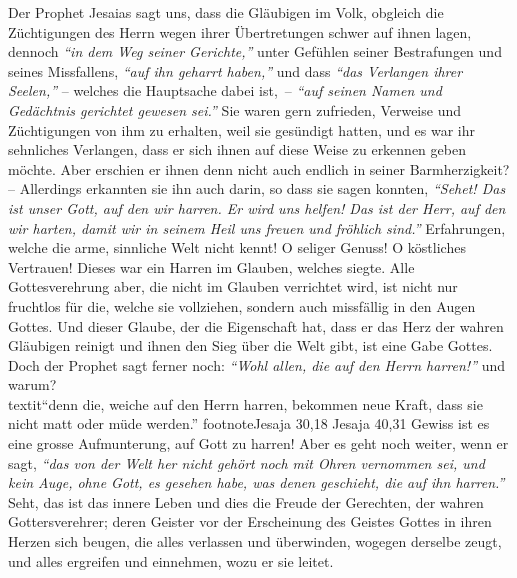 Der Prophet Jesaias sagt uns, dass die Gläubigen im Volk, obgleich die
Züchtigungen des Herrn wegen ihrer Übertretungen schwer auf ihnen lagen,
dennoch
\textit{"`in dem Weg seiner Gerichte,"'} unter Gefühlen seiner Bestrafungen und
seines Missfallens, \textit{"`auf ihn geharrt haben,"'} und dass \textit{"`das
Verlangen ihrer Seelen,"'} -- welches die Hauptsache dabei ist,~--
\textit{"`auf seinen Namen und Gedächtnis gerichtet gewesen
sei."'}
Sie waren gern
zufrieden, Verweise und Züchtigungen von ihm zu erhalten, weil sie gesündigt
hatten, und es war ihr sehnliches Verlangen, dass er sich ihnen auf diese Weise
zu erkennen geben möchte.  Aber erschien er ihnen denn
nicht auch endlich in
seiner Barmherzigkeit? -- Allerdings erkannten sie ihn auch darin, so dass sie
sagen konnten,
\textit{"`Sehet! Das ist unser Gott, auf den wir harren. Er wird uns
helfen! Das ist der Herr, auf den wir harten, damit wir in seinem Heil uns
freuen und fröhlich sind."'}
Erfahrungen, welche die arme,
sinnliche Welt nicht kennt! O seliger Genuss! O köstliches
Vertrauen! Dieses war
ein Harren im Glauben, welches siegte. Alle Gottesverehrung aber, die nicht im
Glauben verrichtet wird, ist nicht nur fruchtlos
 für die, welche sie vollziehen,
sondern auch missfällig in den Augen Gottes. Und dieser Glaube, der die
Eigenschaft hat, dass er das Herz der wahren Gläubigen reinigt und ihnen den
Sieg über die Welt gibt, ist eine Gabe Gottes. Doch
der Prophet sagt
ferner noch:
\textit{"`Wohl allen, die auf den Herrn harren!"'} und warum?\\textit{"`denn
die, weiche
auf den Herrn harren, bekommen neue Kraft, dass sie nicht matt oder müde
werden."'}
footnote{Jesaja 30,18 Jesaja 40,31}
Gewiss ist es eine grosse Aufmunterung, auf Gott
zu harren! Aber es geht noch weiter, wenn er sagt,
\textit{"`das von der Welt her
nicht gehört noch mit Ohren vernommen sei, und kein Auge, ohne Gott, es gesehen
habe, was denen geschieht, die auf ihn harren."'}
Seht, das ist das innere Leben und dies die Freude der Gerechten, der wahren
Gottersverehrer;
deren Geister vor der Erscheinung des Geistes Gottes in ihren Herzen sich
beugen, die alles verlassen und überwinden, wogegen derselbe zeugt, und alles
ergreifen und einnehmen, wozu er sie leitet.

